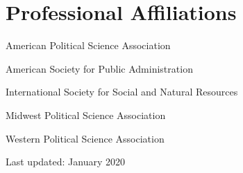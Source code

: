 \documentclass[11pt,letterpaper]{article}
\renewenvironment{itemize}{
  \begin{list}{}{
    \setlength{\leftmargin}{1.5em}
    \setlength{\itemsep}{0.25em}
    \setlength{\parskip}{0pt}
    \setlength{\parsep}{0.25em}
  }
}{
  \end{list}
}
\begin{document}
\section*{Professional Affiliations}
\begin{itemize}
	\item American Political Science Association
	\item American Society for Public Administration
	\item International Society for Social and Natural Resources
	\item Midwest Political Science Association
	\item Western Political Science Association
\end{itemize}


%		
%		
%			

	
\vspace{8in}
\begin{center}
  \begin{small}
    Last updated: January 2020
      \end{small}
\end{center}
\end{document}
